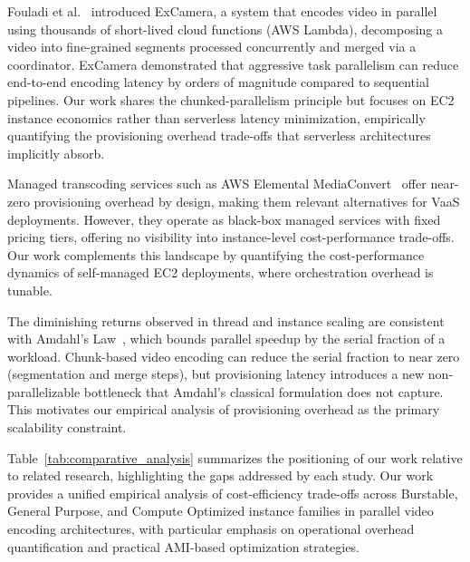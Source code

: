 \documentclass[conference]{IEEEtran}
\begin{document}
Fouladi et al.~\cite{excamera} introduced ExCamera, a system that encodes video in parallel using thousands of short-lived cloud functions (AWS Lambda), decomposing a video into fine-grained segments processed concurrently and merged via a coordinator. ExCamera demonstrated that aggressive task parallelism can reduce end-to-end encoding latency by orders of magnitude compared to sequential pipelines. Our work shares the chunked-parallelism principle but focuses on EC2 instance economics rather than serverless latency minimization, empirically quantifying the provisioning overhead trade-offs that serverless architectures implicitly absorb.

Managed transcoding services such as AWS Elemental MediaConvert~\cite{awsmediaconvert} offer near-zero provisioning overhead by design, making them relevant alternatives for VaaS deployments. However, they operate as black-box managed services with fixed pricing tiers, offering no visibility into instance-level cost-performance trade-offs. Our work complements this landscape by quantifying the cost-performance dynamics of self-managed EC2 deployments, where orchestration overhead is tunable.

The diminishing returns observed in thread and instance scaling are consistent with Amdahl's Law~\cite{b1}, which bounds parallel speedup by the serial fraction of a workload. Chunk-based video encoding can reduce the serial fraction to near zero (segmentation and merge steps), but provisioning latency introduces a new non-parallelizable bottleneck that Amdahl's classical formulation does not capture. This motivates our empirical analysis of provisioning overhead as the primary scalability constraint.

Table~\ref{tab:comparative_analysis} summarizes the positioning of our work
relative to related research, highlighting the gaps addressed by each study.
Our work provides a unified empirical analysis of cost-efficiency trade-offs
across Burstable, General Purpose, and Compute Optimized instance families in
parallel video encoding architectures, with particular emphasis on operational
overhead quantification and practical AMI-based optimization strategies.
\end{document}
